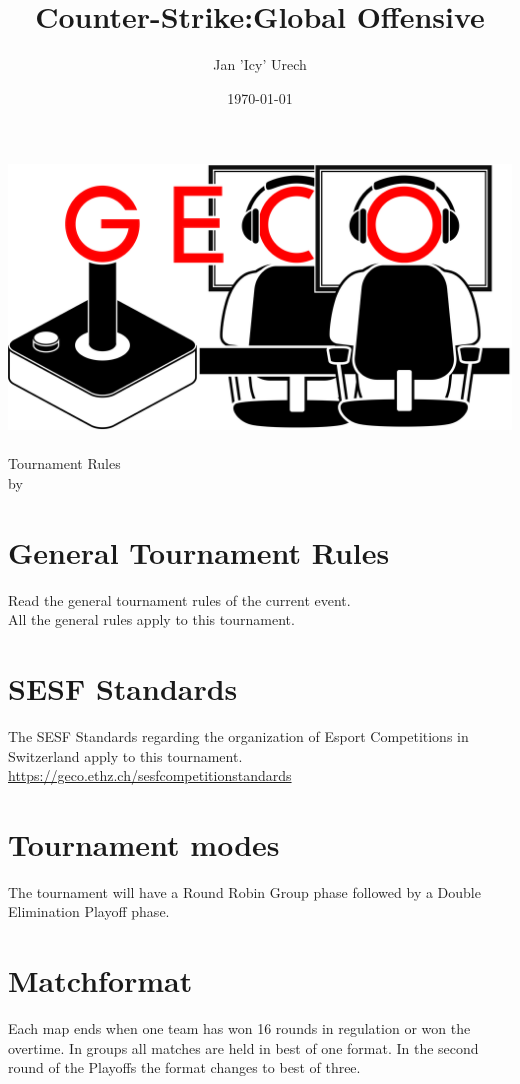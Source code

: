 \documentclass{article}
\title{Counter-Strike:Global Offensive}
\author{Jan 'Icy' Urech }
\date{\today}
\begin{document}
\makeatletter
\begin{titlepage}
\centering
\includegraphics[scale=0.075]{../img/GECo.png}\\
\LARGE \@title\\ Tournament Rules\\ \normalsize by \@author\\ \@date
\end{titlepage}
\makeatother


\clearpage

\tableofcontents
\clearpage

\section{General Tournament Rules}
Read the general tournament rules of the current event.\\
All the general rules apply to this tournament.

\section{SESF Standards}
The SESF Standards regarding the organization of Esport Competitions in Switzerland apply to this tournament. \url{https://geco.ethz.ch/sesfcompetitionstandards}

\section{Tournament modes}
The tournament will have a Round Robin Group phase followed by a Double Elimination Playoff phase.

\section{Matchformat}
Each map ends when one team has won 16 rounds in regulation or won the overtime.
In groups all matches are held in best of one format. In the second round of the Playoffs the format changes to best of three.
\end{document}
